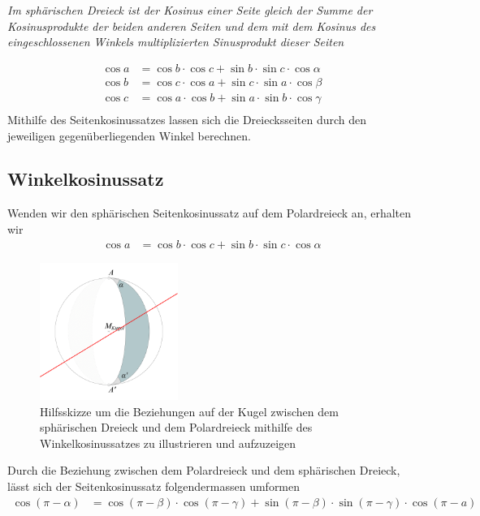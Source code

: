\begin{refsection}
\begin{satz}\textit{Im sphärischen Dreieck ist der Kosinus einer Seite gleich der Summe der Kosinusprodukte der beiden anderen Seiten und dem mit dem Kosinus des eingeschlossenen Winkels multiplizierten Sinusprodukt dieser Seiten}
\label{skript:kugel:satz:Seitenkosinussatz}
\end{satz}
\begin{align*}
{\cos a} &= {\cos b} \cdot {\cos c} + {\sin b} \cdot {\sin c} \cdot {\cos \alpha}\\
{\cos b} &= {\cos c} \cdot {\cos a} + {\sin c} \cdot {\sin a} \cdot {\cos \beta}\\
{\cos c} &= {\cos a} \cdot {\cos b} + {\sin a} \cdot {\sin b} \cdot {\cos \gamma}\\
\end{align*}
Mithilfe des Seitenkosinussatzes lassen sich die Dreiecksseiten durch den jeweiligen gegenüberliegenden Winkel berechnen.


\subsection{Winkelkosinussatz}

Wenden wir den sphärischen Seitenkosinussatz auf dem Polardreieck an, erhalten wir
\begin{align*}
{\cos a} &= {\cos b} \cdot {\cos c} + {\sin b} \cdot {\sin c} \cdot {\cos \alpha}
\end{align*}

\begin{figure}[htbp]
\centering
\includegraphics[width=0.4\textwidth]{kugel/Zweieck.jpg}
\caption{Hilfsskizze um die Beziehungen auf der Kugel zwischen dem sphärischen Dreieck und dem Polardreieck mithilfe des Winkelkosinussatzes zu illustrieren und aufzuzeigen}
\end{figure}

Durch die Beziehung zwischen dem Polardreieck und dem sphärischen Dreieck, lässt sich der Seitenkosinussatz folgendermassen umformen
\begin{align*}
{\cos (\pi-\alpha)} &= {\cos (\pi-\beta)} \cdot {\cos (\pi-\gamma)} + {\sin(\pi-\beta)} \cdot {\sin(\pi-\gamma)} \cdot {\cos (\pi-a)}
\end{align*}


\end{refsection}
